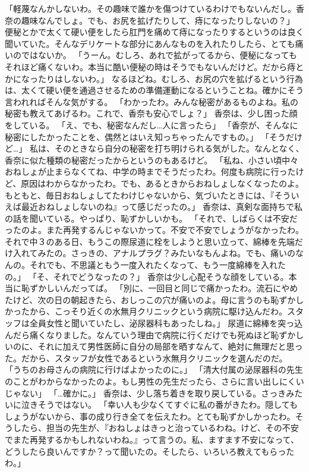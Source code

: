 「軽蔑なんかしないわ。その趣味で誰かを傷つけているわけでもないんだし。香奈の趣味なんでしょ。でも、お尻を拡げたりして、痔になったりしないの？」
便秘とかで太くて硬い便をしたら肛門を痛めて痔になったりするというのは良く聞いていた。そんなデリケートな部分にあんなものを入れたりしたら、とても痛いのではないか。
「うーん。むしろ、あれで拡がってるから、便秘になってもそれほど痛くないわ。本当に酷い便秘の時はそうでもないんだけど。だから痔とかになったりはしないわ。」
なるほどね。むしろ、お尻の穴を拡げるという行為は、太くて硬い便を通過させるための準備運動になるということね。確かにそう言われればそんな気がする。
「わかったわ。みんな秘密があるものよね。私の秘密も教えてあげるわ。これで、香奈も安心でしょ？」
香奈は、少し困った顔をしている。
「え、でも、秘密なんだし…人に言ったら」
「香奈が、そんなに秘密にしたかったことを、偶然とはいえ知っちゃったんですもの。」
「そうだけど…」
私は、そのときなら自分の秘密を打ち明けられる気がした。なんとなく、香奈に似た種類の秘密だったからというのもあるけど。
「私ね、小さい頃中々おねしょが止まらなくてね、中学の時までそうだったわ。何度も病院に行ったけど、原因はわからなかったわ。でも、あるときからおねしょしなくなったのよ。もともと、毎日おねしょしてたわけじゃないから、気づいたときには、『そういえば最近おねしょしないのね』って感じだったの。」
香奈は、真剣な面持ちで私の話を聞いている。やっぱり、恥ずかしいかも。
「それで、しばらくは不安だったのよ。また再発するんじゃないかって。不安で不安でしょうがなかったわ。それで中３のある日、もうこの際尿道に栓をしようと思い立って、綿棒を先端だけ入れてみたの。さっきの、アナルプラグ？みたいなもんよね。でも、痛いのなんの。それでも、不思議ともう一度入れたくなって、もう一度綿棒を入れたの。」
「そ、それでどうなったの？」
香奈は少し心配そうな顔をしている。本当に恥ずかしいんだってば。
「別に、一回目と同じで痛かったわ。流石にやめたけど、次の日の朝起きたら、おしっこの穴が痛いのよ。母に言うのも恥ずかしかったから、こっそり近くの水無月クリニックという病院に駆け込んだわ。スタッフは全員女性と聞いていたし、泌尿器科もあったしね。」
尿道に綿棒を突っ込んだら痛くなりました。なんていう理由で病院に行くだけでも死ぬほど恥ずかしいのに、それに加えて男性医師に自分の局部を晒すなんて、絶対に無理だと思った。だから、スタッフが女性であるという水無月クリニックを選んだのだ。
「うちのお母さんの病院に行けばよかったのに。」
「清大付属の泌尿器科の先生のことがわからなかったのよ。もし男性の先生だったら、さらに言い出しにくいじゃない」
「…確かに。」
香奈は、少し落ち着きを取り戻している。さっきみたいに泣きそうではない。
「幸い人も少なくてすぐに私の番がきたわ。隠してもしょうがないから、事の成り行き全てを伝えたわ。とても恥ずかしかったわ。そうしたら、担当の先生が、『おねしょはきっと治っているわね。けど、その不安でまた再発するかもしれないわね。』って言うの。私、ますます不安になって、どうしたら良いんですか？って聞いたの。そしたら、いろいろ教えてもらったわ。」
